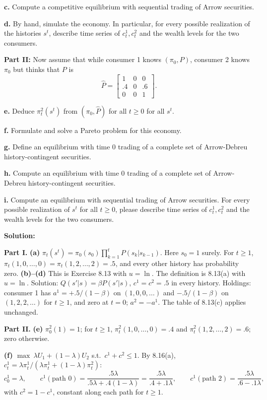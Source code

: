 \documentclass[12pt, letterpaper]{article}
\begin{document}
\begin{tcolorbox}[oddbox,title={Exercise 8.17 \quad Diverse beliefs, III}]
\begin{tcolorbox}[questionbox]
\textbf{c.} Compute a competitive equilibrium with sequential trading of Arrow securities.

\textbf{d.} By hand, simulate the economy. In particular, for every possible realization of the histories $s^t$,
describe time series of $c^1_t,c^2_t$ and the wealth levels for the two consumers.

\textbf{Part II:} Now assume that while consumer 1 knows $(\pi_0,P)$, consumer 2 knows $\pi_0$ but thinks
that $P$ is
\[
\hat P=\begin{bmatrix}1&0&0\\.4&0&.6\\0&0&1\end{bmatrix}.
\]

\textbf{e.} Deduce $\pi^2_t(s^t)$ from $(\pi_0,\hat P)$ for all $t\ge0$ for all $s^t$.

\textbf{f.} Formulate and solve a Pareto problem for this economy.

\textbf{g.} Define an equilibrium with time 0 trading of a complete set of Arrow-Debreu history-contingent
securities.

\textbf{h.} Compute an equilibrium with time 0 trading of a complete set of Arrow-Debreu history-contingent
securities.

\textbf{i.} Compute an equilibrium with sequential trading of Arrow securities. For every possible realization
of $s^t$ for all $t\ge0$, please describe time series of $c^1_t,c^2_t$ and the wealth levels for the two
consumers.
\end{tcolorbox}

\textbf{Solution:}

\textbf{Part I.} \textbf{(a)} $\pi_t(s^t)=\pi_0(s_0)\prod_{k=1}^tP(s_k|s_{k-1})$. Here $s_0=1$ surely. For $t\ge1$,
$\pi_t(1,0,\dots,0)=\pi_t(1,2,\dots,2)=.5$, and every other history has probability zero.
\textbf{(b)--(d)} This is Exercise 8.13 with $u=\ln$. The definition is 8.13(a) with $u=\ln$. Solution:
$Q(s'|s)=\beta P(s'|s)$, $c^1=c^2=.5$ in every history. Holdings: consumer 1 has
$a^1=+.5/(1-\beta)$ on $(1,0,0,\dots)$ and $-.5/(1-\beta)$ on $(1,2,2,\dots)$ for $t\ge1$, and zero at $t=0$;
$a^2=-a^1$. The table of 8.13(c) applies unchanged.

\textbf{Part II.} \textbf{(e)} $\pi^2_0(1)=1$; for $t\ge1$, $\pi^2_t(1,0,\dots,0)=.4$ and $\pi^2_t(1,2,\dots,2)=.6$;
zero otherwise.

\textbf{(f)} $\max\ \lambda U_1+(1-\lambda)U_2$ s.t.\ $c^1+c^2\le1$. By 8.16(a),
$c^1_t=\lambda\pi^1_t/(\lambda\pi^1_t+(1-\lambda)\pi^2_t)$:
\[
c^1_0=\lambda,\qquad c^1(\text{path }0)=\frac{.5\lambda}{.5\lambda+.4(1-\lambda)}=\frac{.5\lambda}{.4+.1\lambda},\qquad
c^1(\text{path }2)=\frac{.5\lambda}{.6-.1\lambda},
\]
with $c^2=1-c^1$, constant along each path for $t\ge1$.


\end{tcolorbox}
\end{document}
